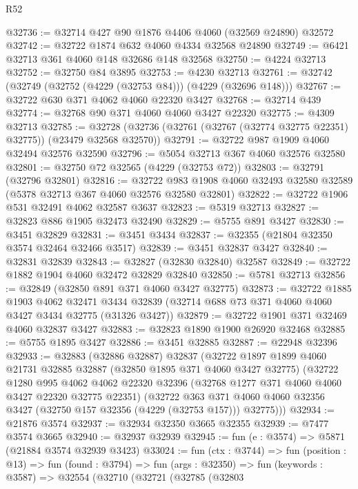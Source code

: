 \begin{lexlean}{R52}
\begin{coremodule}
@32736 := @32714 @427 @90 @1876 @4406 @4060 (@32569 @24890) @32572
@32742 := @32722 @1874 @632 @4060 @4334 @32568 @24890
@32749 := @6421 @32713 @361 @4060 @148 @32686 @148 @32568
@32750 := @4224 @32713
@32752 := @32750 @84 @3895
@32753 := @4230 @32713
@32761 := @32742 (@32749 (@32752 (@4229 (@32753 @84))) (@4229 (@32696 @148)))
@32767 := @32722 @630 @371 @4062 @4060 @22320 @3427
@32768 := @32714 @439
@32774 := @32768 @90 @371 @4060 @4060 @3427 @22320
@32775 := @4309 @32713
@32785 := @32728 (@32736 (@32761 (@32767 (@32774 @32775 @22351) @32775)) (@23479 @32568 @32570))
@32791 := @32722 @987 @1909 @4060 @32494 @32576 @32590
@32796 := @5054 @32713 @367 @4060 @32576 @32580
@32801 := @32750 @72 @32565 (@4229 (@32753 @72))
@32803 := @32791 (@32796 @32801)
@32816 := @32722
    @983
    @1908
    @4060
    @32493
    @32580
    @32589
    (@5378 @32713 @367 @4060 @32576 @32580 @32801)
@32822 := @32722 @1906 @531 @32491 @4062 @32587 @3637
@32823 := @5319 @32713
@32827 := @32823 @886 @1905 @32473 @32490
@32829 := @5755 @891 @3427
@32830 := @3451 @32829
@32831 := @3451 @3434
@32837 := @32355 (@21804 @32350 @3574 @32464 @32466 @3517)
@32839 := @3451 @32837 @3427
@32840 := @32831 @32839
@32843 := @32827 (@32830 @32840) @32587
@32849 := @32722 @1882 @1904 @4060 @32472 @32829 @32840
@32850 := @5781 @32713
@32856 := @32849 (@32850 @891 @371 @4060 @3427 @32775)
@32873 := @32722
    @1885
    @1903
    @4062
    @32471
    @3434
    @32839
    (@32714 @688 @73 @371 @4060 @4060 @3427 @3434 @32775 (@31326 @3427))
@32879 := @32722 @1901 @371 @32469 @4060 @32837 @3427
@32883 := @32823 @1890 @1900 @26920 @32468
@32885 := @5755 @1895 @3427
@32886 := @3451 @32885
@32887 := @22948 @32396
@32933 := @32883
    (@32886 @32887)
    @32837
    (@32722
      @1897
      @1899
      @4060
      @21731
      @32885
      @32887
      (@32850 @1895 @371 @4060 @3427 @32775)
      (@32722
        @1280
        @995
        @4062
        @4062
        @22320
        @32396
        (@32768 @1277 @371 @4060 @4060 @3427 @22320 @32775 @22351)
        (@32722
          @363
          @371
          @4060
          @4060
          @32356
          @3427
          (@32750 @157 @32356 (@4229 (@32753 @157)))
          @32775)))
@32934 := @21876 @3574
@32937 := @32934 @32350 @3665 @32355
@32939 := @7477 @3574 @3665
@32940 := @32937 @32939
@32945 := fun (e : @3574) => @5871 (@21884 @3574 @32939 @3423)
@33024 := fun (ctx : @3744) =>
  fun (position : @13) =>
  fun (found : @3794) =>
  fun (args : @32350) =>
  fun (keywords : @3587) =>
  @32554
    (@32710
      (@32721
        (@32785
          (@32803

\end{coremodule}
\end{lexlean}
